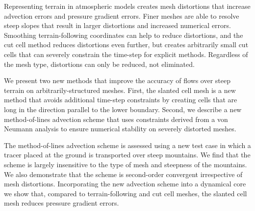 \documentclass[times]{elsarticle}
\begin{document}
Representing terrain in atmospheric models creates mesh distortions that increase advection errors and pressure gradient errors.  Finer meshes are able to resolve steep slopes that result in larger distortions and increased numerical errors.  Smoothing terrain-following coordinates can help to reduce distortions, and the cut cell method reduces distortions even further, but creates arbitrarily small cut cells that can severely constrain the time-step for explicit methods.  Regardless of the mesh type, distortions can only be reduced, not eliminated.

We present two new methods that improve the accuracy of flows over steep terrain on arbitrarily-structured meshes.  First, the slanted cell mesh is a new method that avoids additional time-step constraints by creating cells that are long in the direction parallel to the lower boundary.  Second, we describe a new method-of-lines advection scheme that uses constraints derived from a von Neumann analysis to ensure numerical stability on severely distorted meshes.

The method-of-lines advection scheme is assessed using a new test case in which a tracer placed at the ground is transported over steep mountains.  We find that the scheme is largely insensitive to the type of mesh and steepness of the mountains.  We also demonstrate that the scheme is second-order convergent irrespective of mesh distortions.  Incorporating the new advection scheme into a dynamical core we show that, compared to terrain-following and cut cell meshes, the slanted cell mesh reduces pressure gradient errors.
\end{document}
